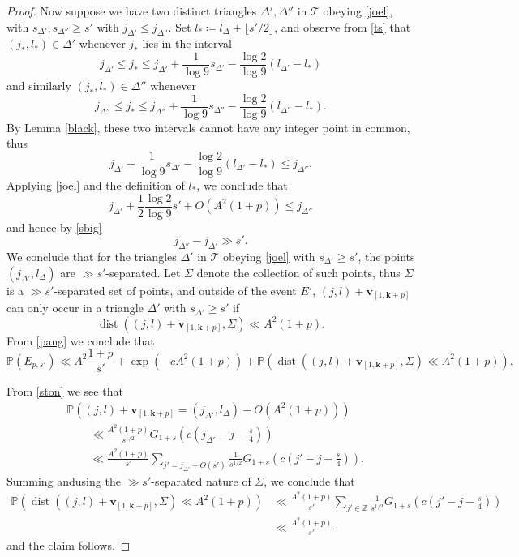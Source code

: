\documentclass[12pt,a4paper,reqno]{amsart}
\numberwithin{equation}{section}
\theoremstyle{plain}
\theoremstyle{definition}
\renewcommand\P{\mathbb{P}}
\newcommand\Z{\mathbb{Z}}
\renewcommand\k{\mathbf{k}}
\renewcommand\v{\mathbf{v}}
\newcommand\dist{{\operatorname{dist}}}
\begin{document}
\begin{proof}
Now suppose we have two distinct triangles $\Delta', \Delta''$ in ${\mathcal T}$ obeying \eqref{joel}, with $s_{\Delta'}, s_{\Delta''} \geq s'$ with $j_{\Delta'} \leq j_{\Delta''}$.  Set $l_* \coloneqq l_\Delta + \lfloor s'/2 \rfloor$, and observe from \eqref{ts} that $(j_*,l_*) \in \Delta'$ whenever $j_*$ lies in the interval
$$ j_{\Delta'} \leq j_* \leq j_{\Delta'} + \frac{1}{\log 9} s_{\Delta'} - \frac{\log 2}{\log 9} (l_{\Delta'} - l_*)$$
and similarly $(j_*,l_*) \in \Delta''$ whenever
$$ j_{\Delta''} \leq j_* \leq j_{\Delta''} + \frac{1}{\log 9} s_{\Delta''} - \frac{\log 2}{\log 9} (l_{\Delta''} - l_*).$$
By Lemma \ref{black}, these two intervals cannot have any integer point in common, thus
$$ j_{\Delta'} + \frac{1}{\log 9} s_{\Delta'} - \frac{\log 2}{\log 9} (l_{\Delta'} - l_*) \leq j_{\Delta''}.$$
Applying \eqref{joel} and the definition of $l_*$, we conclude that
$$ j_{\Delta'} + \frac{1}{2} \frac{\log 2}{\log 9} s' + O( A^2 (1+p) )\leq j_{\Delta''}$$
and hence by \eqref{sbig}
$$ j_{\Delta''} - j_{\Delta'} \gg s'.$$
We conclude that for the triangles $\Delta'$ in ${\mathcal T}$ obeying \eqref{joel} with $s_{\Delta'} \geq s'$, the points $(j_{\Delta'}, l_\Delta)$ are $\gg s'$-separated.  Let $\Sigma$ denote the collection of such points, thus $\Sigma$ is a $\gg s'$-separated set of points, and outside of the event $E'$, $(j,l) + \v_{[1,\k+p]}$ can only occur in a triangle $\Delta'$ with $s_{\Delta'} \geq s'$ if 
$$ \dist( (j,l) + \v_{[1,\k+p]}, \Sigma ) \ll A^2(1+p).$$
From \eqref{pang} we conclude that
$$ \P( E_{p,s'} ) \ll 
A^2 \frac{1+p}{s'} + \exp( - c A^2 (1+p) )
+ \P\left( \dist( (j,l) + \v_{[1,\k+p]}, \Sigma ) \ll A^2(1+p) \right).$$

From \eqref{ston} we see that
\begin{align*}
&\P\left( (j,l) + \v_{[1,\k+p]} = (j_{\Delta'},l_\Delta) + O( A^2(1+p) ) \right)\\
&\quad\quad\ll \frac{A^2(1+p)}{s^{1/2}}
G_{1+s}\left( c(j_{\Delta'}-j - \frac{s}{4}) \right)\\
&\quad\quad\ll \frac{A^2(1+p)}{s'} \sum_{j' = j_{\Delta'} + O(s')}
\frac{1}{s^{1/2}} G_{1+s}\left( c(j'-j - \frac{s}{4}) \right).
\end{align*}
Summing andusing the $\gg s'$-separated nature of $\Sigma$, we conclude that
\begin{align*}
\P( \dist( (j,l) + \v_{[1,\k+p]}, \Sigma ) \ll A^2(1+p) )
&\ll \frac{A^2(1+p)}{s'} \sum_{j' \in \Z}
\frac{1}{s^{1/2}} G_{1+s}( c(j'-j - \frac{s}{4}) ) \\
&\ll \frac{A^2(1+p)}{s'} 
\end{align*}
and the claim follows.
\end{proof}
\end{document}
